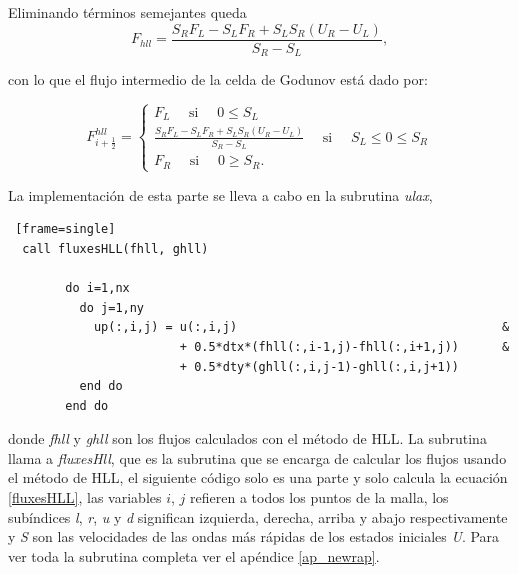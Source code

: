 \documentclass[12pt,a4paper]{book}
\begin{document}
\noindent Eliminando términos semejantes queda
\begin{equation}
F_{hll} = \frac{S_R F_L -S_L F_R + S_L S_R \left(U_R-U_L \right)}{S_R -S_L},
\end{equation}

\noindent con lo que el flujo intermedio de la celda de Godunov está dado por:


\begin{equation} \label{fluxesHLL}
  F_{i+\frac{1}{2}}^{h l l}=\left\{\begin{array}{l}
  F_{L} \quad \text { si } \quad 0 \leq S_{L} \\
  \frac{S_{R} F_{L}-S_{L} F_{R}+S_{L} S_{R}\left(U_{R}-U_{L}\right)}{S_{R}-S_{L}} \quad \text { si } \quad S_{L}  \leq 0 \leq S_{R} \\
  F_{R} \quad \text { si } \quad 0 \geq S_{R}.
  \end{array}\right.
\end{equation}

La implementación de esta parte se lleva a cabo en la subrutina \emph{ulax},

\begin{lstlisting} [frame=single]
  call fluxesHLL(fhll, ghll)
      
        do i=1,nx
          do j=1,ny
            up(:,i,j) = u(:,i,j)                                     &
                        + 0.5*dtx*(fhll(:,i-1,j)-fhll(:,i+1,j))      &
                        + 0.5*dty*(ghll(:,i,j-1)-ghll(:,i,j+1))
          end do
        end do

\end{lstlisting}

\noindent donde \emph{fhll} y \emph{ghll} son los flujos calculados con el método de HLL.
La subrutina llama a \emph{fluxesHll}, que es la subrutina que se encarga de calcular los flujos usando el método de HLL, el siguiente código solo es una parte
y solo calcula la ecuación \ref{fluxesHLL}, las variables $i$, $j$ refieren a todos los puntos de la malla, los subíndices \emph{l}, \emph{r}, \emph{u} y \emph{d}
significan izquierda, derecha, arriba y abajo respectivamente y \emph{S} son las velocidades de las ondas más rápidas de los estados iniciales \emph{U}. Para ver toda la subrutina completa ver el apéndice \ref{ap_newrap}.
\end{document}
